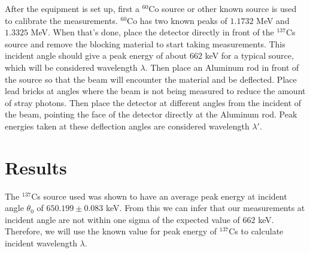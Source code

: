 \documentclass{article}
\begin{document}
After the equipment is set up, first a $^{60}$Co source or other known source is used to calibrate the measurements. $^{60}$Co has two known peaks of $1.1732$ MeV and $1.3325$ MeV. When that's done, place the detector directly in front of the $^{137}$Cs source and remove the blocking material to start taking measurements. This incident angle should give a peak energy of about $662$ keV for a typical source, which will be considered wavelength $\lambda$. Then place an Aluminum rod in front of the source so that the beam will encounter the material and be deflected. Place lead bricks at angles where the beam is not being measured to reduce the amount of stray photons. Then place the detector at different angles from the incident of the beam, pointing the face of the detector directly at the Aluminum rod. Peak energies taken at these deflection angles are considered wavelength $\lambda'$. 

\section{Results}

The $^{137}$Cs source used was shown to have an average peak energy at incident angle $\theta_{0}$ of $650.199 \pm 0.083$ keV. From this we can infer that our measurements at incident angle are not within one sigma of the expected value of $662$ keV. Therefore, we will use the known value for peak energy of $^{137}$Cs to calculate incident wavelength $\lambda$.
\end{document}
